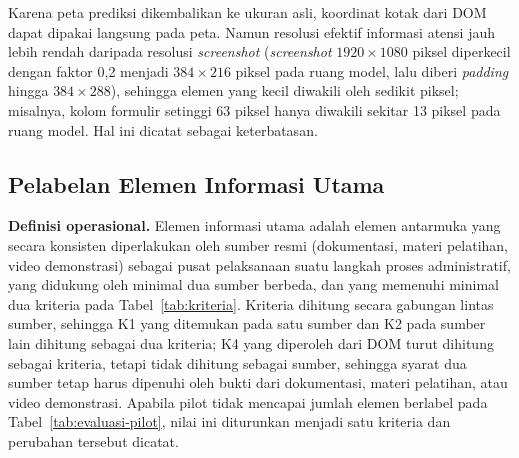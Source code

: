 Karena peta prediksi dikembalikan ke ukuran asli, koordinat kotak dari DOM dapat dipakai langsung pada peta. Namun resolusi efektif informasi atensi jauh lebih rendah daripada resolusi \emph{screenshot} (\emph{screenshot} $1920 \times 1080$ piksel diperkecil dengan faktor 0,2 menjadi $384 \times 216$ piksel pada ruang model, lalu diberi \emph{padding} hingga $384 \times 288$), sehingga elemen yang kecil diwakili oleh sedikit piksel; misalnya, kolom formulir setinggi 63 piksel hanya diwakili sekitar 13 piksel pada ruang model. Hal ini dicatat sebagai keterbatasan.

\subsection{Pelabelan Elemen Informasi Utama}
\label{subsec:pelabelan}

\textbf{Definisi operasional.} Elemen informasi utama adalah elemen antarmuka yang secara konsisten diperlakukan oleh sumber resmi (dokumentasi, materi pelatihan, video demonstrasi) sebagai pusat pelaksanaan suatu langkah proses administratif, yang didukung oleh minimal dua sumber berbeda, dan yang memenuhi minimal dua kriteria pada Tabel~\ref{tab:kriteria}. Kriteria dihitung secara gabungan lintas sumber, sehingga K1 yang ditemukan pada satu sumber dan K2 pada sumber lain dihitung sebagai dua kriteria; K4 yang diperoleh dari DOM turut dihitung sebagai kriteria, tetapi tidak dihitung sebagai sumber, sehingga syarat dua sumber tetap harus dipenuhi oleh bukti dari dokumentasi, materi pelatihan, atau video demonstrasi. Apabila pilot tidak mencapai jumlah elemen berlabel pada Tabel~\ref{tab:evaluasi-pilot}, nilai ini diturunkan menjadi satu kriteria dan perubahan tersebut dicatat.

